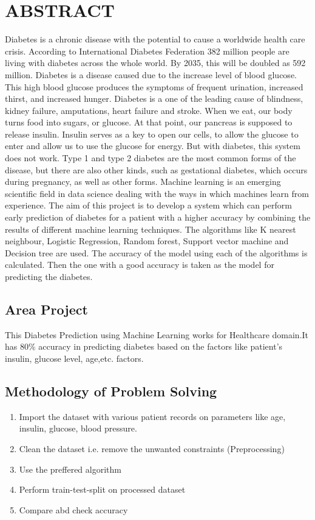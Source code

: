 \documentclass[pdftex,a4paper,11pt,oneside,openright]{report}
\begin{document}
\chapter{ABSTRACT}
\Large{Diabetes is a chronic disease with the potential to cause a worldwide health care crisis. According to International Diabetes Federation 382 million people are living with diabetes across the whole world. By 2035, this will be doubled as 592 million. Diabetes is a disease caused due to the increase level of blood glucose. This high blood glucose produces the symptoms of frequent urination, increased thirst, and increased hunger. Diabetes is a one of the leading cause of blindness, kidney failure, amputations, heart failure and stroke. When we eat, our body turns food into sugars, or glucose. At that point, our pancreas is supposed to release insulin. Insulin serves as a key to open our cells, to allow the glucose to enter and allow us to use the glucose for energy. But with diabetes, this system does not work. Type 1 and type 2 diabetes are the most common forms of the disease, but there are also other kinds, such as gestational diabetes, which occurs during pregnancy, as well as other forms. Machine learning is an emerging scientific field in data science dealing with the ways in which machines learn from experience. The aim of this project is to develop a system which can perform early prediction of diabetes for a patient with a higher accuracy by combining the results of different machine learning techniques. The algorithms like K nearest neighbour, Logistic Regression, Random forest, Support vector machine and Decision tree are used. The accuracy of the model using each of the algorithms is calculated. Then the one with a good accuracy is taken as the model for predicting the diabetes.} 

\section{Area Project}
\Large{This Diabetes Prediction using Machine Learning works for Healthcare domain.It has 80\% accuracy in predicting diabetes based on the factors like patient's insulin, glucose level, age,etc. factors.  }

\section{Methodology of Problem Solving}
\begin{enumerate}
    \item Import the dataset with various patient records on parameters like age, insulin, glucose, blood pressure.
    \item Clean the dataset i.e. remove the unwanted constraints (Preprocessing)
    \item Use the preffered algorithm
    \item Perform train-test-split on processed dataset
    \item Compare abd check accuracy
\end{enumerate}
\end{document}
